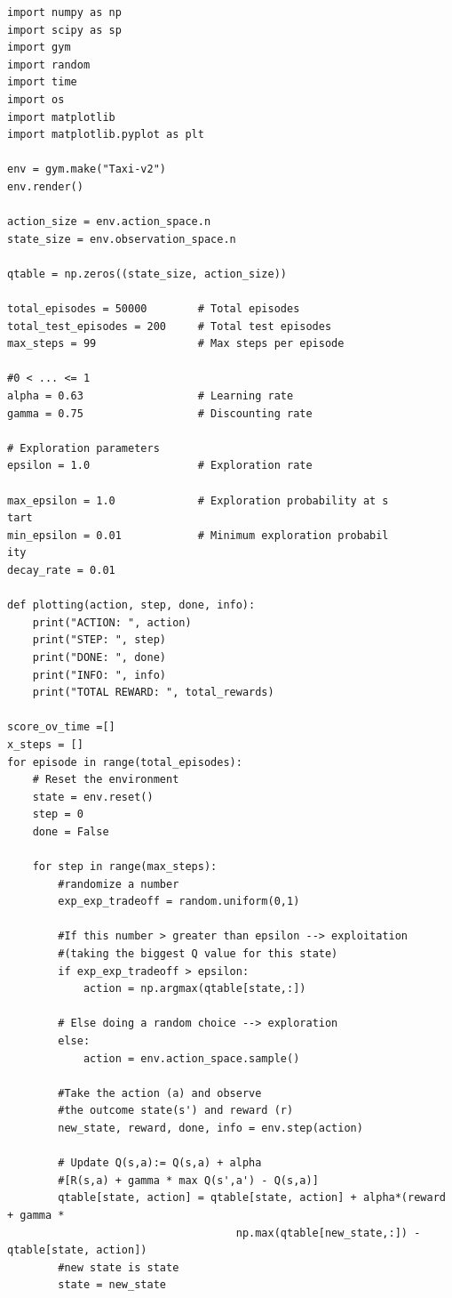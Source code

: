 \documentclass[a4paper]{report}
\theoremstyle{definition}
\theoremstyle{plain}
\theoremstyle{remark}
\theoremstyle{remark}
\theoremstyle{definition}
\begin{document}
\begin{lstlisting}[label=some-code, caption=main.py]
import numpy as np
import scipy as sp
import gym
import random
import time
import os
import matplotlib
import matplotlib.pyplot as plt

env = gym.make("Taxi-v2")
env.render()

action_size = env.action_space.n
state_size = env.observation_space.n

qtable = np.zeros((state_size, action_size))

total_episodes = 50000        # Total episodes
total_test_episodes = 200     # Total test episodes
max_steps = 99                # Max steps per episode

#0 < ... <= 1
alpha = 0.63                  # Learning rate
gamma = 0.75                  # Discounting rate

# Exploration parameters
epsilon = 1.0                 # Exploration rate

max_epsilon = 1.0             # Exploration probability at s
tart
min_epsilon = 0.01            # Minimum exploration probabil
ity
decay_rate = 0.01

def plotting(action, step, done, info):
    print("ACTION: ", action)
    print("STEP: ", step)
    print("DONE: ", done)
    print("INFO: ", info)
    print("TOTAL REWARD: ", total_rewards)

score_ov_time =[]
x_steps = []
for episode in range(total_episodes):
    # Reset the environment
    state = env.reset()
    step = 0
    done = False
    
    for step in range(max_steps):
        #randomize a number
        exp_exp_tradeoff = random.uniform(0,1)
        
        #If this number > greater than epsilon --> exploitation
        #(taking the biggest Q value for this state)
        if exp_exp_tradeoff > epsilon:
            action = np.argmax(qtable[state,:])
        
        # Else doing a random choice --> exploration
        else:
            action = env.action_space.sample()
        
        #Take the action (a) and observe
        #the outcome state(s') and reward (r)
        new_state, reward, done, info = env.step(action)

        # Update Q(s,a):= Q(s,a) + alpha
        #[R(s,a) + gamma * max Q(s',a') - Q(s,a)]
        qtable[state, action] = qtable[state, action] + alpha*(reward + gamma * 
                                    np.max(qtable[new_state,:]) - qtable[state, action])
        #new state is state
        state = new_state
        

\end{lstlisting}
\end{document}
